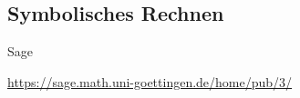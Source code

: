 \documentclass[notes=hide,hyperref={dvipdfmx,pdfpagelabels=false}]{beamer}
\begin{document}
\subsection{Symbolisches Rechnen}

\begin{frame}[fragile]{Sage}
\begin{center}
\url{https://sage.math.uni-goettingen.de/home/pub/3/}
\end{center}
\end{frame}

%
%
\end{document}
